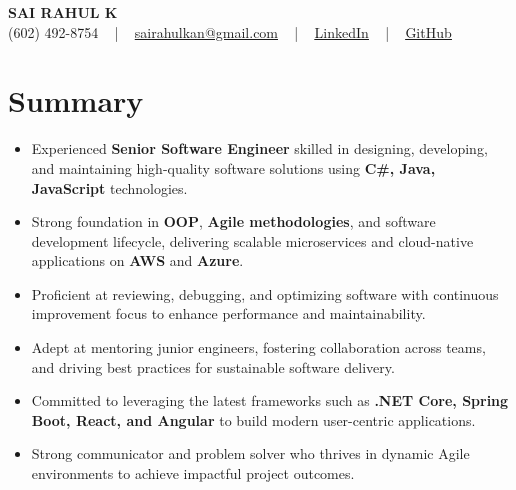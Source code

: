\documentclass[letterpaper,11pt]{article}
\newcommand{\resumeItem}[1]{
  \item\footnotesize{
    {#1 \vspace{-2pt}}
  }
}
\newcommand{\resumeItemListStart}{\begin{itemize}[leftmargin=*]}
\newcommand{\resumeItemListEnd}{\end{itemize}\vspace{-5pt}}
\begin{document}
\begin{center}
    {\fontsize{14pt}{12pt}\selectfont \textbf{\MakeUppercase{Sai Rahul K}}}\\ \vspace{2pt}
    \fontsize{10pt}{12pt}\selectfont (602) 492-8754 ~ | ~ \href{mailto:sairahulkan@gmail.com}{sairahulkan@gmail.com} ~ | ~
    \href{https://www.linkedin.com/in/rq123/}{\color{blue}\underline{LinkedIn}} ~ | ~
    \href{https://github.com/kanrahuldo}{\color{blue}\underline{GitHub}}~
    \vspace{-8pt}
\end{center}

\section{Summary}
\fontsize{9pt}{10pt}\selectfont
\resumeItemListStart
    \resumeItem{Experienced \textbf{Senior Software Engineer} skilled in designing, developing, and maintaining high-quality software solutions using \textbf{C\#, Java, JavaScript} technologies.}
    \resumeItem{Strong foundation in \textbf{OOP}, \textbf{Agile methodologies}, and software development lifecycle, delivering scalable microservices and cloud-native applications on \textbf{AWS} and \textbf{Azure}.}
    \resumeItem{Proficient at reviewing, debugging, and optimizing software with continuous improvement focus to enhance performance and maintainability.}
    \resumeItem{Adept at mentoring junior engineers, fostering collaboration across teams, and driving best practices for sustainable software delivery.}
    \resumeItem{Committed to leveraging the latest frameworks such as \textbf{.NET Core, Spring Boot, React, and Angular} to build modern user-centric applications.}
    \resumeItem{Strong communicator and problem solver who thrives in dynamic Agile environments to achieve impactful project outcomes.}
\resumeItemListEnd
\vspace{-6pt}
\end{document}
